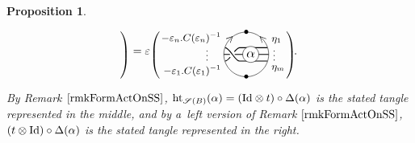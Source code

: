 \documentclass[pdftex]{sigma}%
\numberwithin{equation}{section}
\newtheorem{Proposition}[Theorem]{Proposition}
 { \theoremstyle{definition}
\newtheorem{Definition}[Theorem]{Definition}
\newtheorem{Note}[Theorem]{Note}
\newtheorem{Example}[Theorem]{Example}
\newtheorem{Remark}[Theorem]{Remark} }
\newcommand{\halft}{{\operatorname{ht}}}
\begin{document}
\begin{Proposition}
\[\begin{tikzpicture}[scale = 0.7, baseline = 0pt]
\end{tikzpicture}\!\!
\raisebox{-3pt}{$\left.\rule{0pt}{24pt}\right)$}
=
 \varepsilon\raisebox{-3pt}{$\left(\rule{0pt}{24pt}\right.$}\!\!
 \begin{tikzpicture}[scale = 0.7, baseline = 0pt, rotate = 180]
\draw (0,-1) node{\small $\bullet$} arc(-90:90:1) node[near start, sloped]{\small $>$} node{\small $\bullet$};
\draw (0,-1) arc(-90:-270:1) node[near start, sloped]{\small $<$};
\draw[thick] (-0.94,-0.3)node[above right]{\small $\eta_1$} -- (0.3,-0.3) .. controls (0.5,-0.3) and (0.74,0.3).. (0.94,0.3)node[below left]{\small $-\varepsilon_1.C(\varepsilon_1)^{-1}$} node[pos = 0.5, circle, fill = white, scale = 0.66]{};
\draw[thick] (-1,0) node[yshift=2pt, right]{\footnotesize $\vdots$} -- (1,0)node[yshift=2pt,left=10pt]{\footnotesize $\vdots$} node[pos = 0.81, circle, fill = white, scale = 0.46]{};
\draw[thick] (-0.94,0.3) node[below right]{\small $\eta_m$} -- (0.3,0.3) .. controls (0.5,0.3) and (0.74,-0.3).. (0.94,-0.3)node[above left]{\small $-\varepsilon_n.C(\varepsilon_n)^{-1}$};
\node[circle, fill=white, draw = black, scale = 1.2, inner sep = 1.5pt] (X) at (-0.2,0){$\alpha$};
\end{tikzpicture}\!\!
\raisebox{-3pt}{$\left.\rule{0pt}{24pt}\right)$}\!.
\]
By Remark $\ref{rmkFormActOnSS}$, $\halft_{\mathscr{S}(B)}(\alpha) = ({\rm Id} \otimes t)\circ\Delta(\alpha)$ is the stated tangle represented in the middle, and by a~left version of Remark $\ref{rmkFormActOnSS}$, $(t \otimes {\rm Id})\circ\Delta(\alpha)$ is the stated tangle represented in the right.
\end{Proposition}
\end{document}
